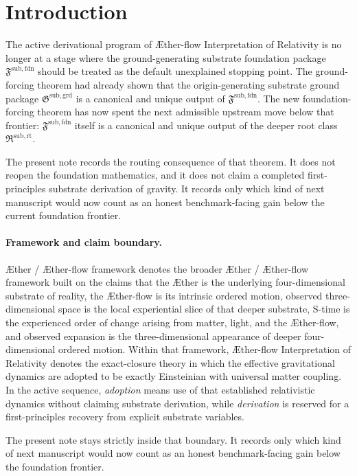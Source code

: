 \documentclass[11pt]{article}
\newcommand{\Aether}{\AE{}ther}
\newcommand{\Aflow}{\AE{}ther-flow}
\newcommand{\TheoryName}{\Aflow{} Interpretation of Relativity}
\newcommand{\TheoryProgram}{\Aether{} / \Aflow{} framework}
\newcommand{\GroundPackage}{\mathfrak G^{\mathrm{sub,grd}}}
\newcommand{\FoundationPackage}{\mathfrak F^{\mathrm{sub,fdn}}}
\newcommand{\RootPackage}{\mathfrak R^{\mathrm{sub,rt}}}
\begin{document}
\section{Introduction}

The active derivational program of \TheoryName{} is no longer at a stage where the ground-generating substrate foundation package \(\FoundationPackage\) should be treated as the default unexplained stopping point. The ground-forcing theorem had already shown that the origin-generating substrate ground package \(\GroundPackage\) is a canonical and unique output of \(\FoundationPackage\). The new foundation-forcing theorem has now spent the next admissible upstream move below that frontier: \(\FoundationPackage\) itself is a canonical and unique output of the deeper root class \(\RootPackage\).

The present note records the routing consequence of that theorem. It does not reopen the foundation mathematics, and it does not claim a completed first-principles substrate derivation of gravity. It records only which kind of next manuscript would now count as an honest benchmark-facing gain below the current foundation frontier.

\paragraph{Framework and claim boundary.}
\TheoryProgram{} denotes the broader \Aether{} / \Aflow{} framework built on the claims that the \Aether{} is the underlying four-dimensional substrate of reality, the \Aflow{} is its intrinsic ordered motion, observed three-dimensional space is the local experiential slice of that deeper substrate, S-time is the experienced order of change arising from matter, light, and the \Aflow{}, and observed expansion is the three-dimensional appearance of deeper four-dimensional ordered motion. Within that framework, \TheoryName{} denotes the exact-closure theory in which the effective gravitational dynamics are adopted to be exactly Einsteinian with universal matter coupling. In the active sequence, \emph{adoption} means use of that established relativistic dynamics without claiming substrate derivation, while \emph{derivation} is reserved for a first-principles recovery from explicit substrate variables.

The present note stays strictly inside that boundary. It records only which kind of next manuscript would now count as an honest benchmark-facing gain below the foundation frontier.
\end{document}
